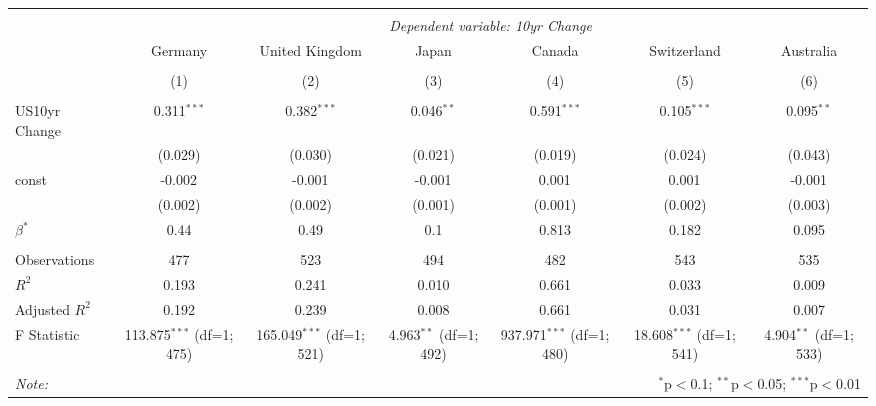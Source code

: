\begin{table}[!htbp] \centering
\begin{tabular}{@{\extracolsep{5pt}}lcccccc}
\\[-1.8ex]\hline
\hline \\[-1.8ex]
& \multicolumn{6}{c}{\textit{Dependent variable: 10yr Change}} \
\cr \cline{2-7}
\\[-1.8ex] & \multicolumn{1}{c}{Germany} & \multicolumn{1}{c}{United Kingdom} & \multicolumn{1}{c}{Japan} & \multicolumn{1}{c}{Canada} & \multicolumn{1}{c}{Switzerland} & \multicolumn{1}{c}{Australia}  \\
\\[-1.8ex] & (1) & (2) & (3) & (4) & (5) & (6) \\
\hline \\[-1.8ex]
 US10yr Change & 0.311$^{***}$ & 0.382$^{***}$ & 0.046$^{**}$ & 0.591$^{***}$ & 0.105$^{***}$ & 0.095$^{**}$ \\
& (0.029) & (0.030) & (0.021) & (0.019) & (0.024) & (0.043) \\
 const & -0.002$^{}$ & -0.001$^{}$ & -0.001$^{}$ & 0.001$^{}$ & 0.001$^{}$ & -0.001$^{}$ \\
& (0.002) & (0.002) & (0.001) & (0.001) & (0.002) & (0.003) \\
 $\beta^*$ & 0.44 & 0.49 & 0.1 & 0.813 & 0.182 & 0.095 \\
\hline \\[-1.8ex]
 Observations & 477 & 523 & 494 & 482 & 543 & 535 \\
 $R^2$ & 0.193 & 0.241 & 0.010 & 0.661 & 0.033 & 0.009 \\
 Adjusted $R^2$ & 0.192 & 0.239 & 0.008 & 0.661 & 0.031 & 0.007 \\
 F Statistic & 113.875$^{***}$ (df=1; 475) & 165.049$^{***}$ (df=1; 521) & 4.963$^{**}$ (df=1; 492) & 937.971$^{***}$ (df=1; 480) & 18.608$^{***}$ (df=1; 541) & 4.904$^{**}$ (df=1; 533) \\
\hline
\hline \\[-1.8ex]
\textit{Note:} & \multicolumn{6}{r}{$^{*}$p$<$0.1; $^{**}$p$<$0.05; $^{***}$p$<$0.01} \\
\end{tabular}
\end{table}